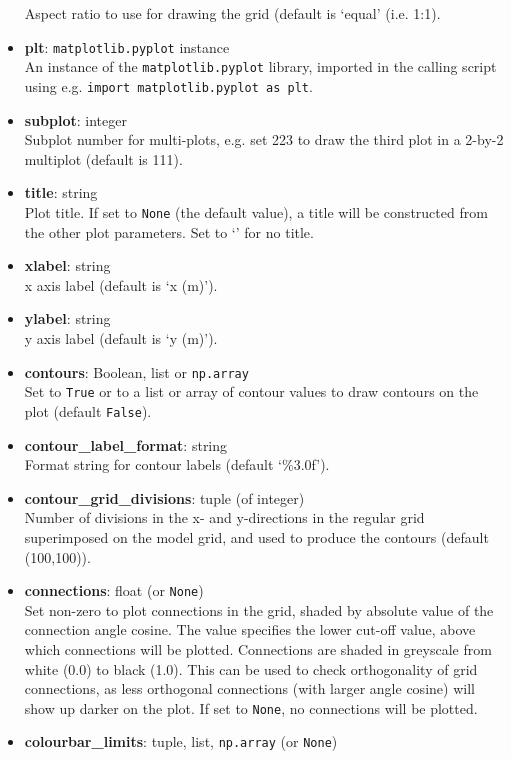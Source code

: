 \begin{itemize}
  Aspect ratio to use for drawing the grid (default is `equal' (i.e. 1:1).
\item \textbf{plt}: \texttt{matplotlib.pyplot} instance\\
  An instance of the \texttt{matplotlib.pyplot} library, imported in the calling script using e.g. \texttt{import matplotlib.pyplot as plt}.
\item \textbf{subplot}: integer\\
  Subplot number for multi-plots, e.g. set 223 to draw the third plot in a 2-by-2 multiplot (default is 111).
\item \textbf{title}: string\\
  Plot title.  If set to \texttt{None} (the default value), a title will be constructed from the other plot parameters.  Set to `' for no title.
\item \textbf{xlabel}: string\\
  x axis label (default is `x (m)').
\item \textbf{ylabel}: string\\
  y axis label (default is `y (m)').
\item \textbf{contours}: Boolean, list or \texttt{np.array}\\
  Set to \texttt{True} or to a list or array of contour values to draw contours on the plot (default \texttt{False}).
\item \textbf{contour\_label\_format}: string\\
  Format string for contour labels (default `\%3.0f').
\item \textbf{contour\_grid\_divisions}: tuple (of integer)\\
  Number of divisions in the x- and y-directions in the regular grid superimposed on the model grid, and used to produce the contours (default (100,100)).
\item \textbf{connections}: float (or \texttt{None})\\
  Set non-zero to plot connections in the grid, shaded by absolute value of the connection angle cosine.  The value specifies the lower cut-off value, above which connections will be plotted.  Connections are shaded in greyscale from white (0.0) to black (1.0).  This can be used to check orthogonality of grid connections, as less orthogonal connections (with larger angle cosine) will show up darker on the plot.  If set to \texttt{None}, no connections will be plotted.
\item \textbf{colourbar\_limits}: tuple, list, \texttt{np.array} (or \texttt{None})\\

\end{itemize}
